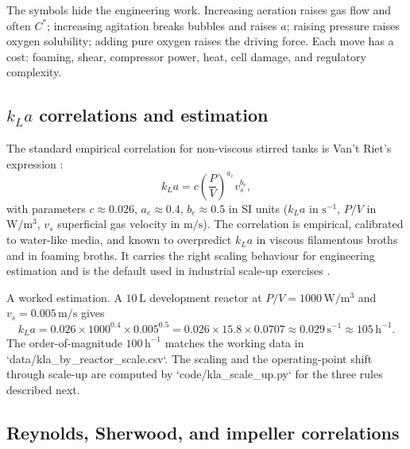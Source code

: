 The symbols hide the engineering work. Increasing aeration raises gas
flow and often $C^\ast$; increasing agitation breaks bubbles and raises
$a$; raising pressure raises oxygen solubility; adding pure oxygen
raises the driving force. Each move has a cost: foaming, shear,
compressor power, heat, cell damage, and regulatory complexity.

\subsection{$k_L a$ correlations and estimation}

The standard empirical correlation for non-viscous stirred tanks is
Van't Riet's expression \cite{paper:v6c10-vantriet-kla-1979}:
\[
k_L a = c \left(\frac{P}{V}\right)^{a_e} v_s^{b_e},
\]
with parameters $c \approx 0.026$, $a_e \approx 0.4$, $b_e \approx 0.5$
in SI units ($k_L a$ in $\text{s}^{-1}$, $P/V$ in $\text{W}/\text{m}^3$,
$v_s$ superficial gas velocity in $\text{m}/\text{s}$). The correlation
is empirical, calibrated to water-like media, and known to overpredict
$k_L a$ in viscous filamentous broths and in foaming broths. It carries
the right scaling behaviour for engineering estimation and is the
default used in industrial scale-up exercises
\cite{paper:v6c10-junker-fermentation-scaleup-2004}.

A worked estimation. A $10\,\text{L}$ development reactor at
$P/V = 1000\,\text{W}/\text{m}^3$ and $v_s = 0.005\,\text{m}/\text{s}$
gives
\[
k_L a = 0.026 \times 1000^{0.4} \times 0.005^{0.5}
= 0.026 \times 15.8 \times 0.0707
\approx 0.029\,\text{s}^{-1} \approx 105\,\text{h}^{-1}.
\]
The order-of-magnitude $100\,\text{h}^{-1}$ matches the working data
in `data/kla_by_reactor_scale.csv`. The scaling and the operating-point
shift through scale-up are computed by `code/kla_scale_up.py` for the
three rules described next.



\subsection{Reynolds, Sherwood, and impeller correlations}

